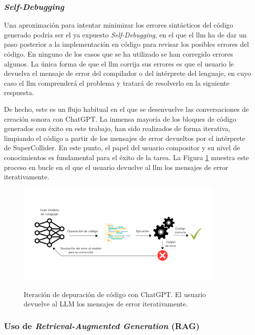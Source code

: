 \subsubsection{\textit{Self-Debugging}}

Una aproximación para intentar minimizar los errores sintácticos del código generado podría ser el ya expuesto \textit{Self-Debugging}, en el que el \gls{llm} ha de dar un paso posterior a la implementación en código para revisar los posibles errores del código. En ninguno de los casos que se ha utilizado se han corregido errores algunos. La única forma de que el \gls{llm} corrija sus errores es que el usuario le devuelva el mensaje de error del compilador o del intérprete del lenguaje, en cuyo caso el \gls{llm} comprenderá el problema y tratará de resolverlo en la siguiente respuesta. 

De hecho, este es un flujo habitual en el que se desenvuelve las conversaciones de creación sonora con ChatGPT. La inmensa mayoría de los bloques de código generados con éxito en este trabajo, han sido realizados de forma iterativa, limpiando el código a partir de los mensajes de error devueltos por el intérprete de SuperCollider. En este punto, el papel del usuario compositor y su nivel de conocimientos es fundamental para el éxito de la tarea. La Figura \ref{fig:iteracion_depuracion} muestra este proceso en bucle en el que el usuario devuelve al \gls{llm} los mensajes de error iterativamente.

\begin{figure}[H]
    \caption[Iteración de depuración de código con ChatGPT]{Iteración de depuración de código con ChatGPT. El usuario devuelve al LLM los mensajes de error iterativamente.}
    \centering
    \includegraphics[width=0.9\textwidth]{./figuras/iteracion_depuracion_codigo.png}
    \label{fig:iteracion_depuracion}
\end{figure}

\subsubsection{Uso de \textit{Retrieval-Augmented Generation} (RAG)}


